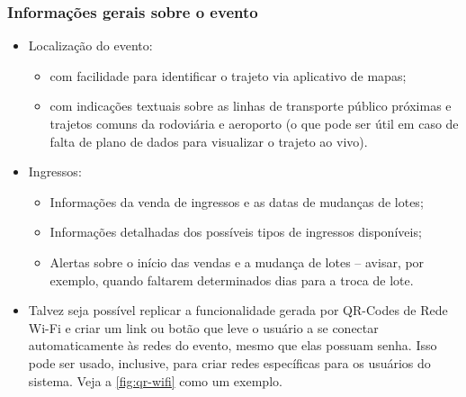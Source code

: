 \documentclass[12pt,a4paper,twoside,hyphens,english,brazil]{abntex2}
\begin{document}
\subsubsection*{Informações gerais sobre o evento}
\begin{itemize}
	\item Localização do evento:
		\begin{itemize}
			\item com facilidade para identificar o trajeto via aplicativo de mapas;
			\item com indicações textuais sobre as linhas de transporte público próximas e trajetos comuns da rodoviária e aeroporto (o que pode ser útil em caso de falta de plano de dados para visualizar o trajeto ao vivo).
		\end{itemize}
	\item Ingressos:
	\begin{itemize}
		\item Informações da venda de ingressos e as datas de mudanças de lotes;
		\item Informações detalhadas dos possíveis tipos de ingressos disponíveis;
		\item Alertas sobre o início das vendas e a mudança de lotes -- avisar, por exemplo, quando faltarem determinados dias para a troca de lote.
	\end{itemize}
	\item Talvez seja possível replicar a funcionalidade gerada por QR-Codes de Rede Wi-Fi e criar um link ou botão que leve o usuário a se conectar automaticamente às redes do evento, mesmo que elas possuam senha. Isso pode ser usado, inclusive, para criar redes específicas para os usuários do sistema. Veja a \autoref{fig:qr-wifi} como um exemplo.
\end{itemize}
\end{document}
